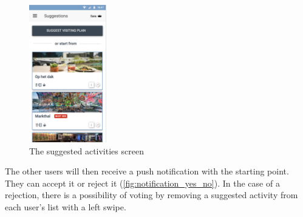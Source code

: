 \documentclass[11pt,a4paper,oneside]{article}
\begin{document}
\begin{figure}[H]
    \centering
    \includegraphics[width=0.3\textwidth]{paper/imgs/hifi_prototypes/results.png}
    \caption{The suggested activities screen}
    \label{fig:results_screen}
\end{figure}

The other users will then receive a push notification with the starting point. They can accept it or reject it (\autoref{fig:notification_yes_no}). In the case of a rejection, there is a possibility of voting by removing a suggested activity from each user's list with a left swipe.

\begin{figure}[H]
    \centering
    \qquad
    \caption{}%
    \label{fig:notification_yes_no}%
\end{figure}
\end{document}

